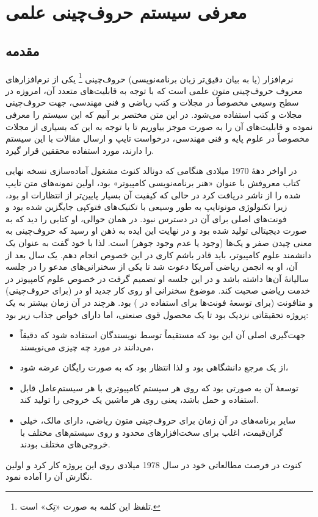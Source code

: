 \chapter{معرفی سیستم حروف‌چینی علمی  \lr{\TeX}}
\section{مقدمه}
نرم‌افزار  (یا به بیان دقیق‌تر زبان برنامه‌نویسی) حروف‌چینی \lr{\TeX}\footnote{تلفظ این کلمه به صورت «تِک» است.}
یکی از نرم‌افزارهای معروف حروف‌چینی متون علمی است
که با توجه به قابلیت‌های متعدد آن، امروزه در سطح وسیعی مخصوصاً در مجلات و کتب ریاضی و فنی مهندسی، 
جهت حروف‌چینی  مجلات و کتب استفاده می‌شود.
 در این متن مختصر بر آنیم
که این سیستم را معرفی نموده و قابلیت‌های آن را به صورت موجز بیاوریم تا با توجه به این که بسیاری از مجلات
مخصوصاً در علوم پایه و فنی مهندسی، درخواست تایپ و ارسال مقالات با این سیستم را دارند، مورد استفاده 
محققین قرار گیرد.

در اواخر دهۀ 1970 میلادی هنگامی که دونالد کنوث
مشغول آماده‌سازی نسخه نهایی کتاب معروفش با عنوان «هنر برنامه‌نویسی کامپیوتر»
بود، اولین نمونه‌های متن تایپ شده را از ناشر دریافت کرد در حالی که کیفیت 
آن بسیار پایین‌تر از انتظارات او بود، زیرا تکنولوژی مونوتایپ 
به طور وسیعی با تکنیک‌های فتوکپی جایگزین شده بود و فونت‌های 
اصلی برای آن در دسترس نبود. در همان حوالی، او کتابی را دید که به صورت دیجیتالی
تولید شده بود و در نهایت این ایده به ذهن او رسید که حروف‌چینی به معنی چیدن صفر و
یک‌ها  (وجود یا عدم وجود جوهر)  است. لذا با خود گفت به عنوان یک دانشمند
علوم کامپیوتر، باید قادر باشم کاری در این خصوص انجام دهم. یک سال بعد از آن، او 
به انجمن ریاضی آمریکا دعوت شد تا یکی از سخنرانی‌های مدعو را در جلسه سالیانۀ
آن‌ها داشته باشد و در این جلسه او تصمیم گرفت در خصوص علوم کامپیوتر در خدمت ریاضی
صحبت کند. موضوع سخنرانی او روی کار جدید او در \lr{\TeX} (برای حروف‌چینی) 
و متافونت (برای توسعۀ فونت‌ها برای استفاده در \lr{\TeX})  بود.  هرچند در آن زمان\lr{\TeX} 
بیشتر به یک پروژه تحقیقاتی نزدیک بود تا یک محصول قوی صنعتی، اما دارای خواص جذاب زیر بود:
\begin{itemize}
\item جهت‌گیری اصلی آن این بود که مستقیماً توسط نویسندگان استفاده شود که
دقیقاً می‌دانند در مورد چه چیزی می‌نویسند،
\item  از یک مرجع دانشگاهی بود و لذا انتظار بود که به صورت رایگان عرضه شود،
\item  توسعۀ آن به صورتی بود که روی هر سیستم کامپیوتری با هر سیستم‌عامل
قابل استفاده و حمل باشد، یعنی روی هر ماشین یک خروجی را تولید کند.
\item سایر برنامه‌های در آن زمان برای حروف‌چینی  متون ریاضی،  دارای مالک، خیلی
گران‌قیمت، اغلب برای سخت‌افزارهای محدود و روی سیستم‌های مختلف با خروجی‌های
مختلف بودند.
\end{itemize}
کنوث در فرصت مطالعاتی خود در سال 1978 میلادی روی این پروژه کار کرد و اولین
نگارش آن را آماده نمود. 

